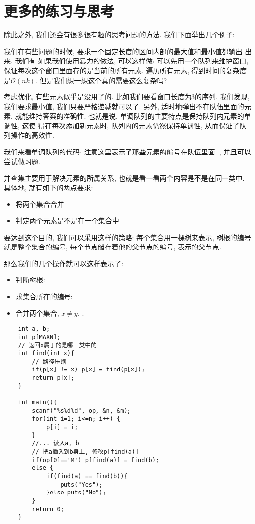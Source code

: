 \section{更多的练习与思考}

除此之外, 我们还会有很多很有趣的思考问题的方法. 我们下面举出几个例子: 

 我们在有些问题的时候, 要求一个固定长度的区间内部的最大值和最小值都输出
出来. 我们有
如果我们使用暴力的做法, 可以这样做: 可以先用一个队列来维护窗口, 保证每次这个窗口里面存的是当前的所有元素. 
遍历所有元素, 得到时间的复杂度是$\mathcal O(nk)$. 但是我们想一想这个真的需要这么复杂吗? 

考虑优化, 有些元素似乎是没用了的. 比如我们要看窗口长度为3的序列. 我们发现, 
我们要求最小值, 我们只要严格递减就可以了. 另外, 适时地弹出不在队伍里面的元素,
就能维持答案的准确性. 也就是说, 单调队列的主要特点是保持队列内元素的单调性, 这使
得在每次添加新元素时, 队列内的元素仍然保持单调性, 从而保证了队列操作的高效性.  


我们来看单调队列的代码: 注意这里表示了那些元素的编号在队伍里面. 
, 并且可以尝试做习题. 

 并查集主要用于解决元素的所属关系, 也就是看一看两个内容是不是在同一类中. 
具体地, 就有如下的两点要求: 
\begin{itemize}[noitemsep]
    \item 将两个集合合并
    \item 判定两个元素是不是在一个集合中
\end{itemize}

要达到这个目的, 我们可以采用这样的策略: 每个集合用一棵树来表示, 树根的编号就是整个集合的编号, 
每个节点储存着他的父节点的编号, 表示的父节点. 

那么我们的几个操作就可以这样表示了: 
\begin{itemize}[noitemsep]
    \item 判断树根: 
    \item 求集合所在的编号: 
    \item 合并两个集合, $x\neq y$. .
\end{itemize}

\begin{lstlisting}
    int a, b; 
    int p[MAXN];
    // 返回x属于的是哪一类中的
    int find(int x){
        // 路径压缩
        if(p[x] != x) p[x] = find(p[x]);
        return p[x];
    }
    
    int main(){
        scanf("%s%d%d", op, &n, &m);
        for(int i=1; i<=n; i++) {
            p[i] = i;
        }
        //... 读入a, b
        // 把a插入到b身上, 修改p[find(a)]
        if(op[0]=='M') p[find(a)] = find(b);
        else {
            if(find(a) == find(b)){
                puts("Yes");
            }else puts("No");
        }
        return 0;
    }
\end{lstlisting}

